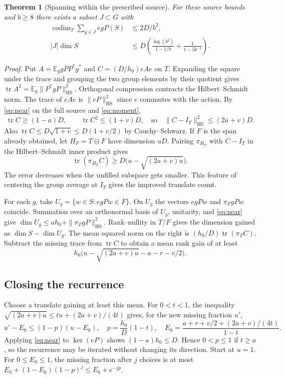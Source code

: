 \documentclass[11pt]{article}
\newtheorem{thm}{Theorem}\newtheorem{lem}[thm]{Lemma}
\newcommand{\E}{\mathbb E}\newcommand{\tr}{\operatorname{tr}}\newcommand{\HS}{\mathrm{HS}}
\begin{document}
\begin{thm}[Spanning within the prescribed source]\label{th:span}
For these source bounds and $b\ge8$ there exists a subset $J\subset G$ with
\begin{align*}
 \operatorname{codim}_T\sum_{g\in J}egP(S)&\le 2D/b^2,\\
 |J|\dim S &\le D\left(\frac{\log(b^2)}{1-1/b}+\frac{1}{1-5b^{-4}}\right).
\end{align*}
\end{thm}
\textit{Proof.} Put $A=\E_g gPP^*g^*$ and $C=(D/h_0)eAe$ on $T$. Expanding the square under the trace and grouping the two group elements by their quotient gives
$\tr A^2=\E_g\|P^*gP\|_{\HS}^2$. Orthogonal compression contracts the Hilbert--Schmidt norm. The trace of $eAe$ is $\|eP\|_{\HS}^2$ since $e$ commutes with the action. By \eqref{eq:near} on the full source and \eqref{eq:moment},
\[
 \tr C\ge (1-a)D,\qquad \tr C^2\le (1+v)D,
 \quad\text{so}\quad\|C-I_T\|_{\HS}^2\le (2a+v)D .
\]
Also $\tr C\le D\sqrt{1+v}\le D(1+v/2)$ by Cauchy--Schwarz. If $F$ is the span already obtained, let $H_F=T\ominus F$ have dimension $uD$. Pairing $\pi_{H_F}$ with $C-I_T$ in the Hilbert--Schmidt inner product gives
\[
  \tr(\pi_{H_F} C)\ge D\big(u-\sqrt{(2a+v)u}\big).
\]
The error decreases when the unfilled subspace gets smaller. This feature of centering the group average at $I_T$ gives the improved translate count.

For each $g$, take $U_g=\{w\in S:egPw\in F\}$. On $U_g$ the vectors $egPw$ and $\pi_FgPw$ coincide. Summation over an orthonormal basis of $U_g$, unitarity, and \eqref{eq:near} give $\dim U_g\le ah_0+\|\pi_FgP\|_{\HS}^2$. Rank--nullity in $T/F$ gives the dimension gained as $\dim S-\dim U_g$. The mean squared norm on the right is $(h_0/D)\tr(\pi_F C)$. Subtract the missing trace from $\tr C$ to obtain a mean rank gain of at least
\[
 h_0\big(u-\sqrt{(2a+v)u}-a-r-v/2\big).
\]

\newpage
\subsection*{Closing the recurrence}
Choose a translate gaining at least this mean. For $0<t<1$, the inequality $\sqrt{(2a+v)u}\le tu+(2a+v)/(4t)$ gives, for the new missing fraction $u'$,
\[
 u'-E_0\le(1-p)(u-E_0),\quad
 p=\frac{h_0}{D}(1-t),\quad
 E_0=\frac{a+r+v/2+(2a+v)/(4t)}{1-t}.
\]
Applying \eqref{eq:near} to $\ker(eP)$ shows $(1-a)h_0\le D$. Hence $0<p\le1$ if $t\ge a$, so the recurrence may be iterated without changing its direction. Start at $u=1$. For $0\le E_0\le1$, the missing fraction after $j$ choices is at most $E_0+(1-E_0)(1-p)^j\le E_0+e^{-jp}$.
\end{document}
